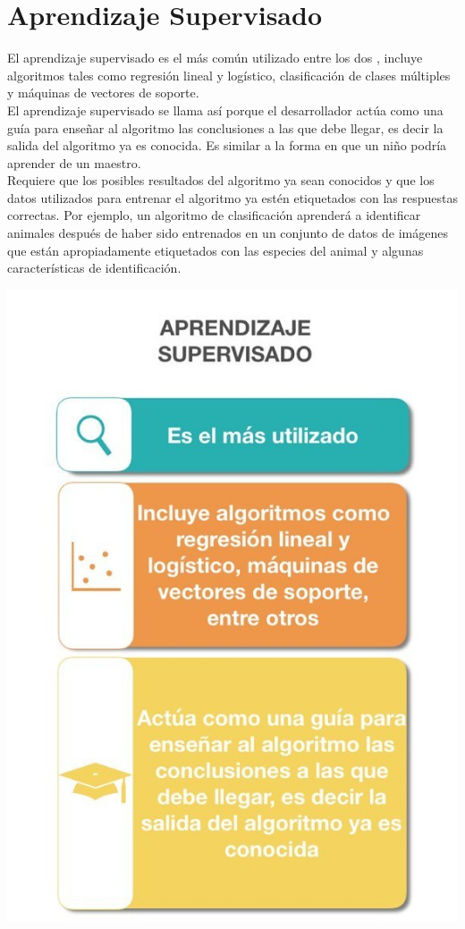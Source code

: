 \documentclass[11pt,a4paper]{article}
\begin{document}
		\section{Aprendizaje Supervisado}
		
			El aprendizaje supervisado es el más común utilizado entre los dos , incluye algoritmos tales como regresión lineal y logístico, clasificación de clases múltiples y máquinas de vectores de soporte.\\

            El aprendizaje supervisado se llama así porque el desarrollador actúa como una guía para enseñar al algoritmo las conclusiones a las que debe llegar, es decir la salida del algoritmo ya es conocida. Es similar a la forma en que un niño podría aprender de un maestro.\\

            Requiere que los posibles resultados del algoritmo ya sean conocidos y que los datos utilizados para entrenar el algoritmo ya estén etiquetados con las respuestas correctas. Por ejemplo, un algoritmo de clasificación aprenderá a identificar animales después de haber sido entrenados en un conjunto de datos de imágenes que están apropiadamente etiquetados con las especies del animal y algunas características de identificación.\\
            
            \begin{center}
		    \includegraphics[scale=1.0]{./Imagenes/AprendisajeSupervisado}
		    \end{center}
			
\end{document}
